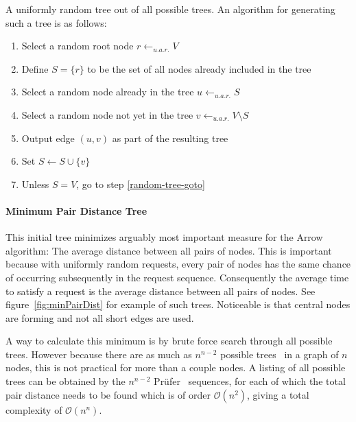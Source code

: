 \documentclass[a4paper, oneside]{discothesis}
\begin{document}
A uniformly random tree out of all possible trees. An algorithm for generating such a tree is as follows:
\begin{enumerate}
\item Select a random root node $r\gets_{u.a.r.}V$
\item Define $S=\{r\}$ to be the set of all nodes already included in the tree
\item Select a random node already in the tree $u\gets_{u.a.r.}S$
\label{random-tree-goto}
\item Select a random node not yet in the tree $v\gets_{u.a.r.}V\setminus S$
\item Output edge $(u,v)$ as part of the resulting tree
\item Set $S\gets S\cup\{v\}$
\item Unless $S=V$, go to step \ref{random-tree-goto}
\end{enumerate}

\paragraph{Minimum Pair Distance Tree}

This initial tree minimizes arguably most important measure for the Arrow algorithm: The average distance between all pairs of nodes. This is important because with uniformly random requests, every pair of nodes has the same chance of occurring subsequently in the request sequence. Consequently the average time to satisfy a request is the average distance between all pairs of nodes. See figure~\ref{fig:minPairDist} for example of such trees. Noticeable is that central nodes are forming and not all short edges are used.

A way to calculate this minimum is by brute force search through all possible trees. However because there are as much as $n^{n-2}$ possible trees~\cite{Borchardt} in a graph of $n$ nodes, this is not practical for more than a couple nodes. A listing of all possible trees can be obtained by the $n^{n-2}$ Prüfer~\cite{Prufer} sequences, for each of which the total pair distance needs to be found which is of order $\mathcal{O}(n^2)$, giving a total complexity of $\mathcal{O}(n^n)$.
\end{document}
